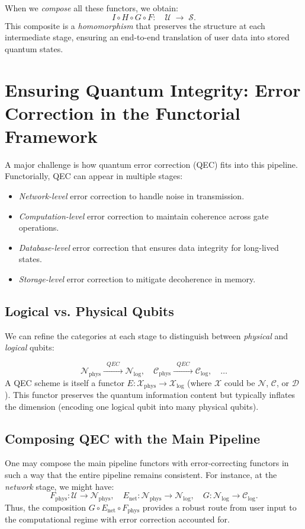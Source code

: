 \documentclass[12pt]{article}
\begin{document}
When we \emph{compose} all these functors, we obtain:
\[
I \circ H \circ G \circ F: \quad \mathcal{U} \;\longrightarrow\; \mathcal{S}.
\]
This composite is a \emph{homomorphism} that preserves the structure at each intermediate stage, ensuring an end-to-end translation of user data into stored quantum states.

\section{Ensuring Quantum Integrity: Error Correction in the Functorial Framework}

A major challenge is how quantum error correction (QEC) fits into this pipeline. Functorially, QEC can appear in multiple stages:
\begin{itemize}
\item \emph{Network-level} error correction to handle noise in transmission.
\item \emph{Computation-level} error correction to maintain coherence across gate operations.
\item \emph{Database-level} error correction that ensures data integrity for long-lived states.
\item \emph{Storage-level} error correction to mitigate decoherence in memory.
\end{itemize}

\subsection{Logical vs. Physical Qubits}
We can refine the categories at each stage to distinguish between \emph{physical} and \emph{logical} qubits:

\[
\mathcal{N}_{\mathrm{phys}} \xrightarrow{\;\;QEC\;\;} \mathcal{N}_{\mathrm{log}}, 
\quad
\mathcal{C}_{\mathrm{phys}} \xrightarrow{\;\;QEC\;\;} \mathcal{C}_{\mathrm{log}},
\quad
\ldots
\]
A QEC scheme is itself a functor $E:\mathcal{X}_{\mathrm{phys}} \to \mathcal{X}_{\mathrm{log}}$ (where $\mathcal{X}$ could be $\mathcal{N}$, $\mathcal{C}$, or $\mathcal{D}$). This functor preserves the quantum information content but typically inflates the dimension (encoding one logical qubit into many physical qubits).

\subsection{Composing QEC with the Main Pipeline}

One may compose the main pipeline functors with error-correcting functors in such a way that the entire pipeline remains consistent. For instance, at the \emph{network} stage, we might have:
\[
F_{\mathrm{phys}}: \mathcal{U} \to \mathcal{N}_{\mathrm{phys}}, 
\quad
E_{\mathrm{net}}: \mathcal{N}_{\mathrm{phys}} \to \mathcal{N}_{\mathrm{log}},
\quad
G: \mathcal{N}_{\mathrm{log}} \to \mathcal{C}_{\mathrm{log}}.
\]
Thus, the composition $G \circ E_{\mathrm{net}} \circ F_{\mathrm{phys}}$ provides a robust route from user input to the computational regime with error correction accounted for.
\end{document}
